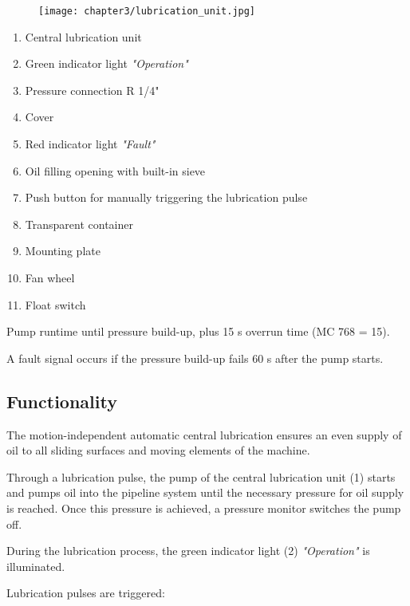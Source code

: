 \newpage
{}

\begin{figure}[h]
    \centering
    \texttt{[image: chapter3/lubrication\_unit.jpg]}
\end{figure}

\begin{enumerate}
    \item Central lubrication unit
    \item Green indicator light \textit{"Operation"}
    \item Pressure connection R 1/4"
    \item Cover
    \item Red indicator light \textit{"Fault"}
    \item Oil filling opening with built-in sieve
    \item Push button for manually triggering the lubrication pulse
    \item Transparent container
    \item Mounting plate
    \item Fan wheel
    \item Float switch
\end{enumerate}


Pump runtime until pressure build-up, plus 15 s overrun time (MC 768 = 15).

A fault signal occurs if the pressure build-up fails 60 s after the pump starts.

\newpage

\subsection*{Functionality}

The motion-independent automatic central lubrication ensures an even supply of oil to all sliding surfaces and moving elements of the machine.

Through a lubrication pulse, the pump of the central lubrication unit (1) starts and pumps oil into the pipeline system until the necessary pressure for oil supply is reached. Once this pressure is achieved, a pressure monitor switches the pump off.

During the lubrication process, the green indicator light (2) \textit{"Operation"} is illuminated.

Lubrication pulses are triggered:


